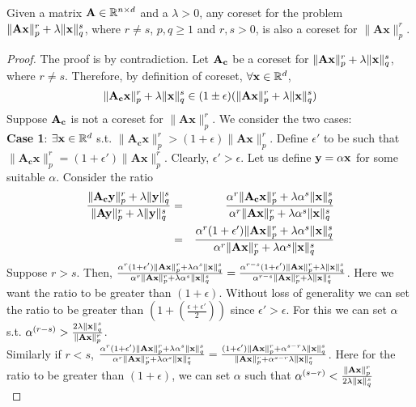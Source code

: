 \begin{theorem}\label{th:ss preserve}Given a matrix $\mathbf{A} \in \mathbb{R}^{n \times d}$ and a $\lambda >0$, any coreset for the problem $\|\mathbf{Ax}\|_p^r + \lambda \|\mathbf{x}\|_q^s $, where $r \neq s$, $p,q \geq 1$ and $ r,s > 0 $, is also a coreset for  $\|\mathbf{Ax}\|_p^r $.
\end{theorem}
\begin{proof}
	The proof is by contradiction. Let $\mathbf{A_c}$ be a coreset for $\|\mathbf{Ax}\|_p^r + \lambda \|\mathbf{x}\|_q^s $, where $r \neq s$. Therefore, by definition of coreset, $\forall \mathbf{x} \in \mathbb{R}^d$,
	$$ \|\mathbf{A_cx}\|_p^r + \lambda \|\mathbf{x}\|_q^s \in (1 \pm \epsilon)(\|\mathbf{Ax}\|_p^r + \lambda \|\mathbf{x}\|_q^s)$$
	Suppose $\mathbf{A_c}$ is not a coreset for $\|\mathbf{Ax}\|_p^r $. We consider the two cases:\\
	\textbf{Case 1}:  $\exists  \mathbf{x} \in \mathbb{R}^{d}$ s.t. $\|\mathbf{A_cx}\|_p^r > (1+\epsilon) \|\mathbf{Ax}\|_p^r$. Define $\epsilon'$ to be such that $\|\mathbf{A_cx}\|_p^r = (1+\epsilon')\|\mathbf{Ax}\|_p^r$. Clearly, $\epsilon' > \epsilon$. Let us define $\mathbf{y}=\alpha\mathbf{x}$ for some suitable $\alpha$. Consider the ratio
	\begin{eqnarray*}
	\frac{\|\mathbf{A_cy}\|_p^r + \lambda \|\mathbf{y}\|_q^s}{\|\mathbf{Ay}\|_p^r + \lambda \|\mathbf{y}\|_q^s}
	&=&\frac{\alpha^r \|\mathbf{A_c x}\|_p^r + \lambda\alpha^s \|\mathbf{x}\|_q^s}{\alpha^r \|\mathbf{Ax}\|_p^r + \lambda\alpha^s \|\mathbf{x}\|_q^s}\\
	&=&\frac{\alpha^r(1+\epsilon')\|\mathbf{Ax}\|_p^r + \lambda\alpha^s \|\mathbf{x}\|_q^s}{\alpha^r \|\mathbf{Ax}\|_p^r + \lambda\alpha^s \|\mathbf{x}\|_q^s}
	\end{eqnarray*}
	 Suppose $r>s$. Then, $ 
	      \frac{\alpha^r(1+\epsilon')\|\mathbf{Ax}\|_p^r + \lambda\alpha^s \|\mathbf{x}\|_q^s}{\alpha^r \|\mathbf{Ax}\|_p^r + \lambda\alpha^s \|\mathbf{x}\|_q^s}   = 
	    \frac{\alpha^{r-s}(1+\epsilon')\|\mathbf{Ax}\|_p^r + \lambda \|\mathbf{x}\|_q^s}{\alpha^{r-s} \|\mathbf{Ax}\|_p^r + \lambda \|\mathbf{x}\|_q^s} $. Here we want the ratio to be greater than $(1+ \epsilon)$.
	  Without loss of generality  we can set the ratio to be greater than $(1+(\frac{\epsilon + \epsilon'}{2}))$ since $\epsilon' > \epsilon$. For this we can set $\alpha$ s.t. $\alpha^{(r-s)} > \frac{2\lambda\|\mathbf{x}\|_q^s}{\|\mathbf{Ax}\|_p^r} $.\\
	 Similarly if $r<s$, $
	     \frac{\alpha^r(1+\epsilon')\|\mathbf{Ax}\|_p^r + \lambda\alpha^s \|\mathbf{x}\|_q^s}{\alpha^r \|\mathbf{Ax}\|_p^r + \lambda\alpha^s \|\mathbf{x}\|_q^s}  =  \frac{(1+\epsilon')\|\mathbf{Ax}\|_p^r + \alpha^{s-r} \lambda \|\mathbf{x}\|_q^s}{ \|\mathbf{Ax}\|_p^r + \alpha^{s-r}\lambda \|\mathbf{x}\|_q^s}$. Here for the ratio to be greater than $(1+\epsilon)$, we can set $\alpha$ such that $\alpha^{(s-r)} < \frac{\|\mathbf{Ax}\|_p^r}{2\lambda\|\mathbf{x}\|_q^s}$\\

\end{proof}
